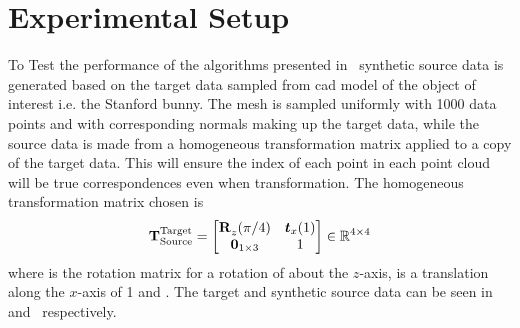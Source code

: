 \section{Experimental Setup}\label{sec:2-pose-estimation-experimental-setup}

To Test the performance of the algorithms presented in~ synthetic source data is generated based on the target data sampled from \gls{cad} model of the object of interest i.e. the Stanford bunny. The mesh is sampled uniformly with \num{1000} data points and with corresponding normals making up the target data, while the source data is made from a homogeneous transformation matrix applied to a copy of the target data. This will ensure the index  of each point in each point cloud will be true correspondences even when transformation. The homogeneous transformation matrix chosen is
\begin{equation}
	\tf[T]{\text{Target}}{\text{Source}} = 
	\begin{bmatrix}
		\tf[R]{}{z}(\pi/4) & \vec{t}_x(1) \\
		\vec{0}_{1\times 3} & 1
	\end{bmatrix}\inR{4\times 4}
\end{equation} 
where  is the rotation matrix for a rotation of  about the $z$-axis,  is a translation along the $x$-axis of \num{1} and . The target and synthetic source data can be seen in  and~ respectively.

